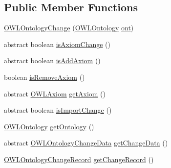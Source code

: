 \subsection*{Public Member Functions}
\begin{DoxyCompactItemize}
\item 
\hyperlink{classorg_1_1semanticweb_1_1owlapi_1_1model_1_1_o_w_l_ontology_change_af0f227dfa1b3476e9f8e62a2b096817d}{O\-W\-L\-Ontology\-Change} (\hyperlink{interfaceorg_1_1semanticweb_1_1owlapi_1_1model_1_1_o_w_l_ontology}{O\-W\-L\-Ontology} \hyperlink{classorg_1_1semanticweb_1_1owlapi_1_1model_1_1_o_w_l_ontology_change_a9b8b64f1cab33aae500db20e19186211}{ont})
\item 
abstract boolean \hyperlink{classorg_1_1semanticweb_1_1owlapi_1_1model_1_1_o_w_l_ontology_change_a62f900169f7dcb89e53d58ae14ea84e7}{is\-Axiom\-Change} ()
\item 
abstract boolean \hyperlink{classorg_1_1semanticweb_1_1owlapi_1_1model_1_1_o_w_l_ontology_change_aad1e06d792588258319b06e328966bc9}{is\-Add\-Axiom} ()
\item 
boolean \hyperlink{classorg_1_1semanticweb_1_1owlapi_1_1model_1_1_o_w_l_ontology_change_a6e2fcc5c72234b6dd4143619853d9491}{is\-Remove\-Axiom} ()
\item 
abstract \hyperlink{interfaceorg_1_1semanticweb_1_1owlapi_1_1model_1_1_o_w_l_axiom}{O\-W\-L\-Axiom} \hyperlink{classorg_1_1semanticweb_1_1owlapi_1_1model_1_1_o_w_l_ontology_change_a29ad105346b4433a9080281d9a9f45a7}{get\-Axiom} ()
\item 
abstract boolean \hyperlink{classorg_1_1semanticweb_1_1owlapi_1_1model_1_1_o_w_l_ontology_change_aa7fe98a39e1659ee2b16aaa1b6ccd4b9}{is\-Import\-Change} ()
\item 
\hyperlink{interfaceorg_1_1semanticweb_1_1owlapi_1_1model_1_1_o_w_l_ontology}{O\-W\-L\-Ontology} \hyperlink{classorg_1_1semanticweb_1_1owlapi_1_1model_1_1_o_w_l_ontology_change_aeeab733082d6e4cc8dd39d183d6e88d7}{get\-Ontology} ()
\item 
abstract \hyperlink{classorg_1_1semanticweb_1_1owlapi_1_1change_1_1_o_w_l_ontology_change_data}{O\-W\-L\-Ontology\-Change\-Data} \hyperlink{classorg_1_1semanticweb_1_1owlapi_1_1model_1_1_o_w_l_ontology_change_a30dca4cf4eeafa199039ac705dc233d6}{get\-Change\-Data} ()
\item 
\hyperlink{classorg_1_1semanticweb_1_1owlapi_1_1change_1_1_o_w_l_ontology_change_record}{O\-W\-L\-Ontology\-Change\-Record} \hyperlink{classorg_1_1semanticweb_1_1owlapi_1_1model_1_1_o_w_l_ontology_change_a9f051d90a37a6c318ddd0c17c557526e}{get\-Change\-Record} ()

\end{DoxyCompactItemize}
